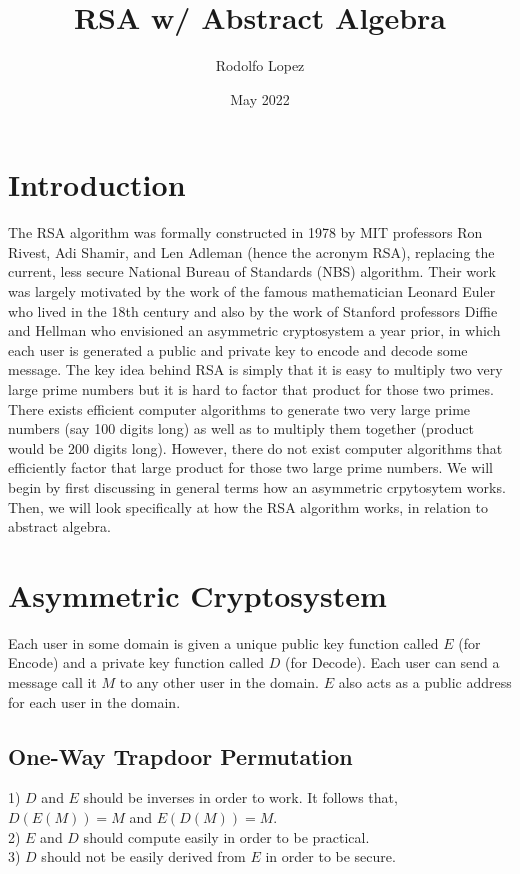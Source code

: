 \documentclass{article}
\title{RSA w/ Abstract Algebra}
\author{Rodolfo Lopez}
\date{May 2022}
\begin{document}
\maketitle

\section{Introduction}
The RSA algorithm was formally constructed in 1978 by MIT professors Ron Rivest, Adi Shamir, and Len Adleman (hence the acronym RSA), replacing the current, less secure National Bureau of Standards (NBS) algorithm. Their work was largely motivated by the work of the famous mathematician Leonard Euler who lived in the 18th century and also by the work of Stanford professors Diffie and Hellman who envisioned an asymmetric cryptosystem a year prior, in which each user is generated a public and private key to encode and decode some message. The key idea behind RSA is simply that it is easy to multiply two very large prime numbers but it is hard to factor that product for those two primes. There exists efficient computer algorithms to generate two very large prime numbers (say 100 digits long) as well as to multiply them together (product would be 200 digits long). However, there do not exist computer algorithms that efficiently factor that large product for those two large prime numbers. We will begin by first discussing in general terms how an asymmetric crpytosytem works. Then, we will look specifically at how the RSA algorithm works, in relation to abstract algebra. 

\section{Asymmetric Cryptosystem}
Each user in some domain is given a unique public key function called $E$ (for Encode) and a private key function called $D$ (for Decode). Each user can send a message call it $M$ to any other user in the domain. $E$ also acts as a public address for each user in the domain.

\subsection{One-Way Trapdoor Permutation}
1) $D$ and $E$ should be inverses in order to work. It follows that, $D(E(M)) = M$ and $E(D(M)) = M$. \\
2) $E$ and $D$ should compute easily in order to be practical. \\
3) $D$ should not be easily derived from $E$ in order to be secure. \\
\end{document}
